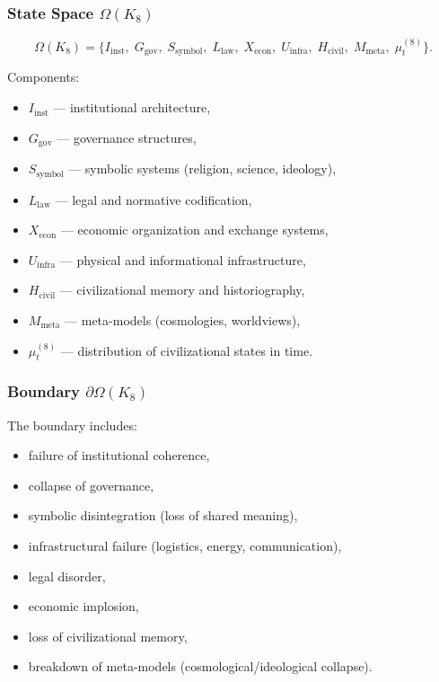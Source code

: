\subsubsection{State Space \texorpdfstring{$\Omega(K_8)$}{\Omega(K_8)}}

\[
\Omega(K_8)=
\{
I_{\mathrm{inst}},\;
G_{\mathrm{gov}},\;
S_{\mathrm{symbol}},\;
L_{\mathrm{law}},\;
X_{\mathrm{econ}},\;
U_{\mathrm{infra}},\;
H_{\mathrm{civil}},\;
M_{\mathrm{meta}},\;
\mu^{(8)}_t
\}.
\]

Components:
\begin{itemize}
    \item $I_{\mathrm{inst}}$ — institutional architecture,
    \item $G_{\mathrm{gov}}$ — governance structures,
    \item $S_{\mathrm{symbol}}$ — symbolic systems (religion, science, ideology),
    \item $L_{\mathrm{law}}$ — legal and normative codification,
    \item $X_{\mathrm{econ}}$ — economic organization and exchange systems,
    \item $U_{\mathrm{infra}}$ — physical and informational infrastructure,
    \item $H_{\mathrm{civil}}$ — civilizational memory and historiography,
    \item $M_{\mathrm{meta}}$ — meta-models (cosmologies, worldviews),
    \item $\mu^{(8)}_t$ — distribution of civilizational states in time.
\end{itemize}

\subsubsection{Boundary \texorpdfstring{$\partial\Omega(K_8)$}{\partial\Omega(K_8)}}

The boundary includes:
\begin{itemize}
    \item failure of institutional coherence,
    \item collapse of governance,
    \item symbolic disintegration (loss of shared meaning),
    \item infrastructural failure (logistics, energy, communication),
    \item legal disorder,
    \item economic implosion,
    \item loss of civilizational memory,
    \item breakdown of meta-models (cosmological/ideological collapse).
\end{itemize}

